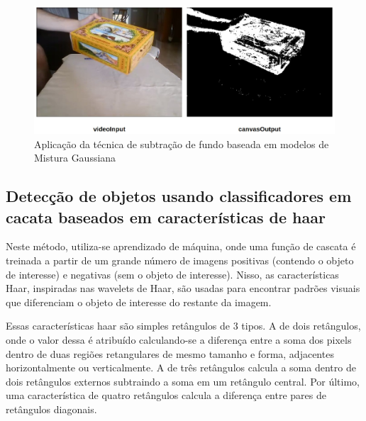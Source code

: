 \documentclass[12pt, %
openright, 
oneside, %
a4paper,    %
brazil]{facom-ufu-abntex2}
\begin{document}

\begin{figure}[ht]
	\begin{center}
		\includegraphics[width=0.7\linewidth]{background_subtraction.jpeg}
	\end{center}
	\caption{Aplicação da técnica de subtração de fundo baseada em modelos de Mistura Gaussiana}
\end{figure}

\subsection{Detecção de objetos usando classificadores em cacata baseados em características de haar}

Neste método, utiliza-se aprendizado de máquina, onde uma função de cascata é
treinada a partir de um grande número de imagens positivas (contendo o objeto
de interesse) e negativas (sem o objeto de interesse). Nisso, as
características Haar, inspiradas nas wavelets de Haar, são usadas para
encontrar padrões visuais que diferenciam o objeto de interesse do restante da
imagem.

Essas características haar são simples retângulos de 3 tipos. A de dois
retângulos, onde o valor dessa é atribuído calculando-se a diferença entre a
soma dos pixels dentro de duas regiões retangulares de mesmo tamanho e forma,
adjacentes horizontalmente ou verticalmente. A de três retângulos calcula a
soma dentro de dois retângulos externos subtraindo a soma em um retângulo
central. Por último, uma característica de quatro retângulos calcula a
diferença entre pares de retângulos diagonais.
\end{document}
